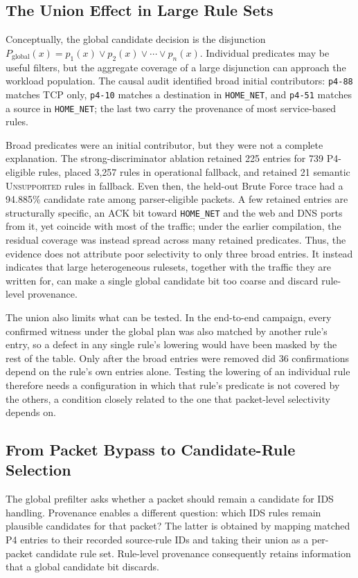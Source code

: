 \documentclass{article}
\begin{document}
\subsection{The Union Effect in Large Rule Sets}
Conceptually, the global candidate decision is the disjunction
$P_{\mathrm{global}}(x)=p_1(x) \lor p_2(x) \lor \cdots \lor p_n(x)$.
Individual predicates may be useful filters, but the aggregate coverage of a
large disjunction can approach the workload population. The causal audit
identified broad initial contributors: \texttt{p4-88} matches TCP only,
\texttt{p4-10} matches a destination in \texttt{HOME\_NET}, and
\texttt{p4-51} matches a source in \texttt{HOME\_NET}; the last two carry the
provenance of most service-based rules.

Broad predicates were an initial contributor, but they were not a complete
explanation. The strong-discriminator ablation retained 225 entries for 739
P4-eligible rules, placed 3,257 rules in operational fallback, and retained
21 semantic \textsc{Unsupported} rules in fallback. Even then, the held-out
Brute Force trace had a 94.885\% candidate rate among parser-eligible
packets. A few retained entries are structurally specific, an ACK bit toward
\texttt{HOME\_NET} and the web and DNS ports from it, yet coincide with most
of the traffic; under the earlier compilation, the residual coverage was
instead spread across many retained predicates. Thus, the evidence does not
attribute poor selectivity to only three broad entries. It instead indicates
that large heterogeneous rulesets, together with the traffic they are written
for, can make a single global candidate bit too coarse and discard
rule-level provenance.

The union also limits what can be tested. In the end-to-end campaign, every
confirmed witness under the global plan was also matched by another rule's
entry, so a defect in any single rule's lowering would have been masked by
the rest of the table. Only after the broad entries were removed did 36
confirmations depend on the rule's own entries alone. Testing the lowering
of an individual rule therefore needs a configuration in which that rule's
predicate is not covered by the others, a condition closely related to the
one that packet-level selectivity depends on.
\subsection{From Packet Bypass to Candidate-Rule Selection}
The global prefilter asks whether a packet should remain a candidate for IDS
handling. Provenance enables a different question: which IDS rules remain
plausible candidates for that packet? The latter is obtained by mapping
matched P4 entries to their recorded source-rule IDs and taking their union
as a per-packet candidate rule set. Rule-level provenance consequently
retains information that a global candidate bit discards.
\end{document}
